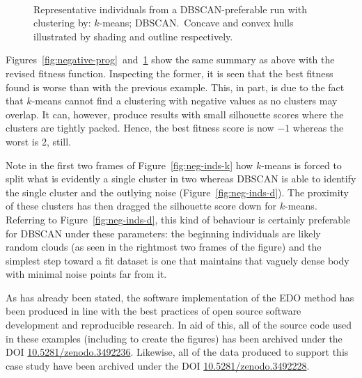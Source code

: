 \documentclass[11pt]{article}
\newlength{\imgwidth}
\begin{document}
\begin{figure}[htbp]
    \centering
    \\
    \caption[]{%
        Representative individuals from a DBSCAN-preferable run with clustering
        by:  \(k\)-means; 
        DBSCAN.\ Concave and convex hulls illustrated by shading and outline
        respectively. 
    }\label{fig:negative-inds}
\end{figure}

Figures~\ref{fig:negative-prog}~and~\ref{fig:negative-inds} show the same
summary as above with the revised fitness function. Inspecting the former, it is
seen that the best fitness found is worse than with the previous example. This,
in part, is due to the fact that \(k\)-means cannot find a clustering with
negative values as no clusters may overlap. It can, however, produce results
with small silhouette scores where the clusters are tightly packed. Hence, the
best fitness score is now \(-1\) whereas the worst is 2, still.

Note in the first two frames of Figure~\ref{fig:neg-inds-k} how \(k\)-means is
forced to split what is evidently a single cluster in two whereas DBSCAN is able
to identify the single cluster and the outlying noise
(Figure~\ref{fig:neg-inds-d}). The proximity of these clusters has then dragged
the silhouette score down for \(k\)-means. Referring to
Figure~\ref{fig:neg-inds-d}, this kind of behaviour is certainly preferable for
DBSCAN under these parameters: the beginning individuals are likely random
clouds (as seen in the rightmost two frames of the figure) and the simplest step
toward a fit dataset is one that maintains that vaguely dense body with minimal
noise points far from it.

As has already been stated, the software implementation of the EDO method
has been produced in line with the best practices of open source software
development and reproducible research. In aid of this, all of the source code
used in these examples (including to create the figures) has been archived
under the DOI
\href{https://doi.org/10.5281/zenodo.3492236}{10.5281/zenodo.3492236}.
Likewise, all of the data produced to support this case study have been archived
under the DOI
\href{https://doi.org/10.5281/zenodo.3492228}{10.5281/zenodo.3492228}.
\end{document}
